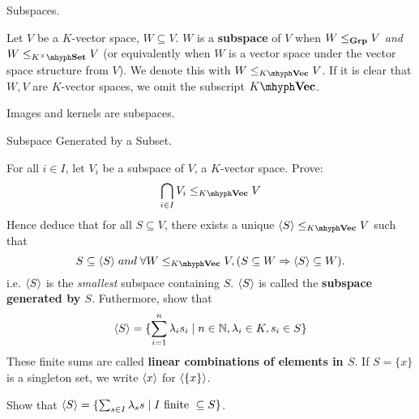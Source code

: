 \documentclass[../../book.tex]{subfiles}
\begin{document}
\begin{dfn} Subspaces. 

    Let $V$ be a $K$-vector space, $W \subseteq V$.
    $W$ is a \textbf{subspace} of $V$ when 
    $W \leq_{\mathbf{Grp}} V$ \emph{and} $W \leq_{K^\times\mhyph\Set} V$
    (or equivalently when $W$ is a vector space
    under the vector space structure from $V$).
    We denote this with $W \leq_{\KVec} V$. 
    If it is clear that $W, V$ are $K$-vector spaces,
    we omit the subscript $\KVec$. 
    
\end{dfn}
\begin{eg}
    Images and kernels are subspaces.
\end{eg}
\begin{ex} Subspace Generated by a Subset. 

    For all $i \in I$, let $V_i$ be a subspace of $V$, a $K$-vector space. 
    Prove: 
    \[\bigcap_{i \in I} V_i \leq_{\KVec} V\] 
    Hence deduce that for all $S \subseteq V$, there exists a unique $\< S\> \leq_{\KVec} V$ such that
    \[
        S \subseteq \< S \> \;and\;
        \forall W \leq_{\KVec} V, (S \subseteq W \imp \< S \> \subseteq W). 
    \]
    i.e. $\langle S \rangle$ is the \emph{smallest} subspace containing $S$. 
    $\langle S \rangle$ is called the \textbf{subspace generated by $S$}. 
    Futhermore, show that 
    \[\langle S \rangle = \{\sum_{i = 1}^n \lambda_i s_i \mid n \in \mathbb{N}, \lambda_i \in K, s_i \in S\}\]
    These finite sums are called \textbf{linear combinations of elements in $S$}.
    If $S = \{x\}$ is a singleton set, 
    we write $\langle x \rangle$ for $\langle \{x\} \rangle$. 
    
    Show that $\langle S\rangle = \{\sum_{s\in I} \lambda_s s \mid I \text{ finite }\subseteq S \}$.
\end{ex}
\end{document}
